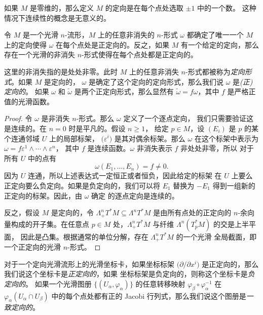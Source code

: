 如果 $M$ 是零维的，那么定义 $M$ 的定向是在每个点处选取 $\pm 1$ 中的一个数。
这种情况下连续性的概念是无意义的。

\begin{proposition}[由 $n$-形式确定的定向]
  令 $M$ 是一个光滑 $n$-流形，$M$ 上的任意非消失的 $n$-形式 $\omega$ 都确定了唯一一个
  $M$ 上的定向使得 $\omega$ 在每个点处是正定向的。反之，如果 $M$
  有一个给定的定向，那么存在一个光滑的非消失 $n$-形式使得在每个点处都是正定向的。
\end{proposition}
\begin{remark}
  这里的非消失指的是处处非零。此时 $M$ 上的任意非消失 $n$-形式都被称为\emph{定向形式}。如果 $M$ 是定向的，
  $\omega$ 是确定了这个定向的定向形式，那么我们说 $\omega$ 是\emph{(正)定向的}。
  如果 $\omega$ 和 $\tilde\omega$ 是两个正定向形式，那么显然有 
  $\tilde\omega=f\omega$，其中 $f$ 是严格正值的光滑函数。
\end{remark}
\begin{proof}
  令 $\omega$ 是非消失 $n$-形式。那么 $\omega$ 定义了一个逐点定向，
  我们只需要验证这是连续的。在 $n=0$ 时是平凡的。假设 $n\ge 1$，
  给定 $p\in M$，设 $(E_i)$ 是 $p$ 的某个连通邻域 $U$ 上的局部标架，
  $\bigl(\varepsilon^i\bigr)$ 是其对偶余标架。那么 $\omega$
  在这个标架中表示为 $\omega=f\varepsilon^1\wedge\cdots\wedge\varepsilon^n$，
  其中 $f$ 是连续函数。$\omega$ 非消失表示 $f$ 非处处非零，所以
  对于所有 $U$ 中的点有
  \[
    \omega(E_1,\dots,E_n)=f\neq 0.
  \]
  因为 $U$ 连通，所以上述表达式一定恒正或者恒负，因此给定的标架
  在 $U$ 上要么正定向要么负定向。如果是负定向的，我们可以将 $E_1$
  替换为 $-E_1$ 得到一组新的正定向的标架。因此，由 $\omega$ 确定
  的逐点定向是连续的。

  反之，假设 $M$ 是定向的，令 $\Lambda_+^nT^*M\subseteq \Lambda^nT^*M$
  是由所有点处的正定向的 $n$-余向量构成的开子集。在任意点 $p\in M$
  处，$\Lambda_+^nT^*M$ 与纤维 $\Lambda^n(T_p^*M)$ 的交是上半平面，
  因此是凸集。根据通常的单位分解，存在 $\Lambda_+^nT^*M$ 的一个光滑
  全局截面，即一个正定向的光滑 $n$-形式。
\end{proof}

对于一个定向光滑流形上的光滑坐标卡，如果坐标标架 $\bigl(\partial/\partial x^i\bigr)$
是正定向的，那么我们说这个坐标卡是\emph{正定向的}，如果
坐标标架是负定向的，则称这个坐标卡是\emph{负定向的}。
如果一个光滑图册 $\{(U_\alpha,\varphi_\alpha)\}$ 的任意转移映射
$\varphi_\beta\circ\varphi_\alpha^{-1}$ 在 $\varphi_\alpha(U_\alpha\cap U_\beta)$
中的每个点处都有正的 Jacobi 行列式，那么我们说这个图册是\emph{一致定向的}。


